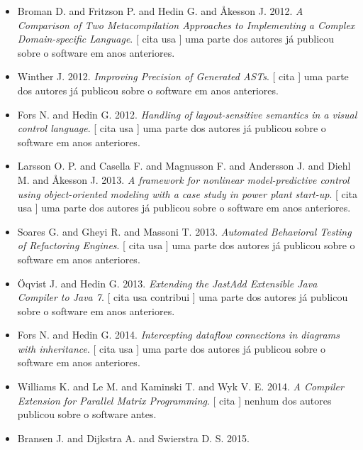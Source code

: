 \begin{itemize}
      [
          cita
          usa
      ]
uma parte dos autores já publicou sobre o software em anos anteriores.
\item Broman D. and Fritzson P. and Hedin G. and Åkesson J.
      2012.
        \textit{ A Comparison of Two Metacompilation Approaches to Implementing a Complex Domain-specific Language}.
      [
          cita
          usa
      ]
uma parte dos autores já publicou sobre o software em anos anteriores.
\item Winther J.
      2012.
        \textit{ Improving Precision of Generated ASTs}.
      [
          cita
      ]
uma parte dos autores já publicou sobre o software em anos anteriores.
\item Fors N. and Hedin G.
      2012.
        \textit{ Handling of layout-sensitive semantics in a visual control language}.
      [
          cita
          usa
      ]
uma parte dos autores já publicou sobre o software em anos anteriores.
\item Larsson O. P. and Casella F. and Magnusson F. and Andersson J. and Diehl M. and Åkesson J.
      2013.
        \textit{ A framework for nonlinear model-predictive control using object-oriented modeling with a case study in power plant start-up}.
      [
          cita
          usa
      ]
uma parte dos autores já publicou sobre o software em anos anteriores.
\item Soares G. and Gheyi R. and Massoni T.
      2013.
        \textit{ Automated Behavioral Testing of Refactoring Engines}.
      [
          cita
          usa
      ]
uma parte dos autores já publicou sobre o software em anos anteriores.
\item \"{O}qvist J. and Hedin G.
      2013.
        \textit{ Extending the JastAdd Extensible Java Compiler to Java 7}.
      [
          cita
          usa
          contribui
      ]
uma parte dos autores já publicou sobre o software em anos anteriores.
\item Fors N. and Hedin G.
      2014.
        \textit{ Intercepting dataflow connections in diagrams with inheritance}.
      [
          cita
          usa
      ]
uma parte dos autores já publicou sobre o software em anos anteriores.
\item Williams K. and Le M. and Kaminski T. and Wyk V. E.
      2014.
        \textit{ A Compiler Extension for Parallel Matrix Programming}.
      [
          cita
      ]
nenhum dos autores publicou sobre o software antes.
\item Bransen J. and Dijkstra A. and Swierstra D. S.
      2015.

\end{itemize}
